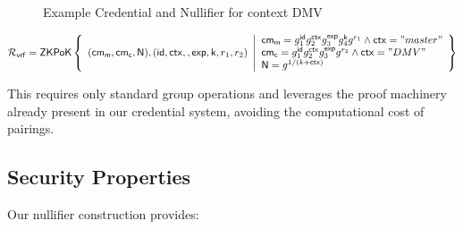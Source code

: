 \begin{figure}
        \begin{pchstack}[boxed, center, space=4em]
            \begin{pcvstack}
            \end{pcvstack}
            \pcvspace
            \begin{pcvstack}
            \end{pcvstack}
            \begin{pcvstack}
            \end{pcvstack}
        \end{pchstack}
    \caption{Example Credential and Nullifier for context DMV}
    \label{fig:two-creds}
\end{figure}


\[
    \mathcal{R}_{\mathsf{vrf}} = {\mathsf{ZKPoK}} \left\{ 
    \begin{array}{l} 
    (\mathsf{cm_m}, \mathsf{cm_c}, \mathsf{N}), (\mathsf{id}, \mathsf{ctx}, , \mathsf{exp}, \mathsf{k}, r_1, r_2) \\
    \end{array} 
    \middle|
    \begin{array}{l}
        \mathsf{cm_m} = g_1^{\mathsf{id}}g_2^{\mathsf{ctx}}g_3^{\mathsf{exp}}g_4^{\mathsf{k}}g^{r_1}  \wedge \mathsf{ctx}="master" \\
        \mathsf{cm_c} = g_1^{\mathsf{id}}g_2^{\mathsf{ctx}}g_3^{\mathsf{exp}}g^{r_2} \wedge \mathsf{ctx}="DMV" \\
        \mathsf{N} = g^{1/(k + \mathsf{ctx})}
    \end{array} 
    \right\}
\]
    

This requires only standard group operations and leverages the proof machinery already present in our credential system, avoiding the computational cost of pairings.




\subsection{Security Properties}
Our nullifier construction provides:


